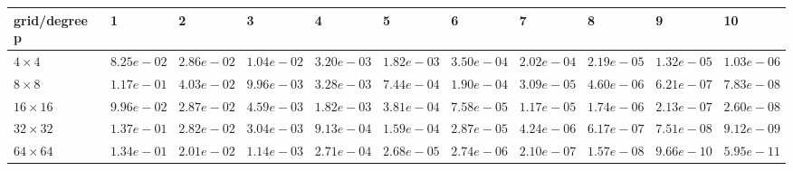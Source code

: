 \begin{tabular}{lllllllllll}
\hline
 grid/degree p   & 1          & 2          & 3          & 4          & 5          & 6          & 7          & 8          & 9          & 10         \\
\hline
 $4 \times 4$    & $8.25e-02$ & $2.86e-02$ & $1.04e-02$ & $3.20e-03$ & $1.82e-03$ & $3.50e-04$ & $2.02e-04$ & $2.19e-05$ & $1.32e-05$ & $1.03e-06$ \\
 $8 \times 8$    & $1.17e-01$ & $4.03e-02$ & $9.96e-03$ & $3.28e-03$ & $7.44e-04$ & $1.90e-04$ & $3.09e-05$ & $4.60e-06$ & $6.21e-07$ & $7.83e-08$ \\
 $16 \times 16$  & $9.96e-02$ & $2.87e-02$ & $4.59e-03$ & $1.82e-03$ & $3.81e-04$ & $7.58e-05$ & $1.17e-05$ & $1.74e-06$ & $2.13e-07$ & $2.60e-08$ \\
 $32 \times 32$  & $1.37e-01$ & $2.82e-02$ & $3.04e-03$ & $9.13e-04$ & $1.59e-04$ & $2.87e-05$ & $4.24e-06$ & $6.17e-07$ & $7.51e-08$ & $9.12e-09$ \\
 $64 \times 64$  & $1.34e-01$ & $2.01e-02$ & $1.14e-03$ & $2.71e-04$ & $2.68e-05$ & $2.74e-06$ & $2.10e-07$ & $1.57e-08$ & $9.66e-10$ & $5.95e-11$ \\
\hline
\end{tabular}